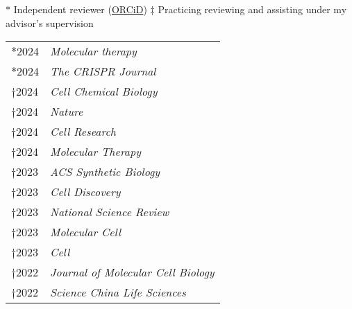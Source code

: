 






% 

\small

$*$ Independent reviewer (\href{https://orcid.org/0000-0002-4934-4731}{ORCiD})\hspace{2em}   $\ddag$ Practicing reviewing and assisting under my advisor's supervision


\begin{longtable}[l]{@{}p{} p{}}
    $*$2024 & \textit{Molecular therapy} \\
    $*$2024 & \textit{The CRISPR Journal} \\
    $\dagger$2024 & \textit{Cell Chemical Biology} \\
    $\dagger$2024 & \textit{Nature} \\
    $\dagger$2024 & \textit{Cell Research} \\
    $\dagger$2024 & \textit{Molecular Therapy} \\
    $\dagger$2023 & \textit{ACS Synthetic Biology} \\
    $\dagger$2023 & \textit{Cell Discovery} \\
    $\dagger$2023 & \textit{National Science Review} \\
    $\dagger$2023 & \textit{Molecular Cell} \\
    $\dagger$2023 & \textit{Cell} \\
    $\dagger$2022 & \textit{Journal of Molecular Cell Biology} \\
    $\dagger$2022 & \textit{Science China Life Sciences} \\
\end{longtable}

